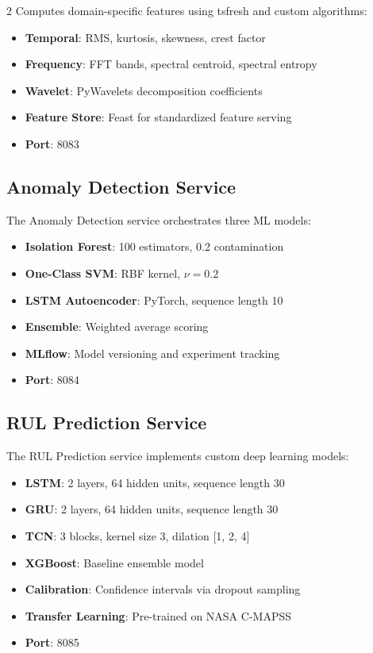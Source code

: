 \documentclass{ijceds} %
\begin{document}
\begin{multicols}{2}
Computes domain-specific features using tsfresh and custom algorithms:

\begin{itemize}
    \item \textbf{Temporal}: RMS, kurtosis, skewness, crest factor
    \item \textbf{Frequency}: FFT bands, spectral centroid, spectral entropy
    \item \textbf{Wavelet}: PyWavelets decomposition coefficients
    \item \textbf{Feature Store}: Feast for standardized feature serving
    \item \textbf{Port}: 8083
\end{itemize}

\subsection{Anomaly Detection Service}

The Anomaly Detection service orchestrates three ML models:

\begin{itemize}
    \item \textbf{Isolation Forest}: 100 estimators, 0.2 contamination
    \item \textbf{One-Class SVM}: RBF kernel, $\nu = 0.2$
    \item \textbf{LSTM Autoencoder}: PyTorch, sequence length 10
    \item \textbf{Ensemble}: Weighted average scoring
    \item \textbf{MLflow}: Model versioning and experiment tracking
    \item \textbf{Port}: 8084
\end{itemize}

\subsection{RUL Prediction Service}

The RUL Prediction service implements custom deep learning models:

\begin{itemize}
    \item \textbf{LSTM}: 2 layers, 64 hidden units, sequence length 30
    \item \textbf{GRU}: 2 layers, 64 hidden units, sequence length 30
    \item \textbf{TCN}: 3 blocks, kernel size 3, dilation [1, 2, 4]
    \item \textbf{XGBoost}: Baseline ensemble model
    \item \textbf{Calibration}: Confidence intervals via dropout sampling
    \item \textbf{Transfer Learning}: Pre-trained on NASA C-MAPSS
    \item \textbf{Port}: 8085
\end{itemize}


\end{multicols}
\end{document}

